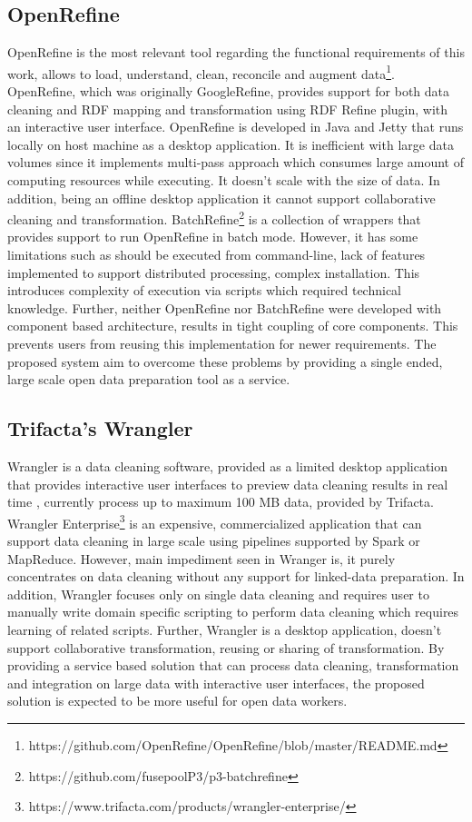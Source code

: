 \subsection{OpenRefine}
OpenRefine is the most relevant tool regarding the functional requirements of this work, allows to load, understand, clean, reconcile and augment data\footnote{https://github.com/OpenRefine/OpenRefine/blob/master/README.md}. OpenRefine, which was originally GoogleRefine, provides support for both data cleaning and RDF mapping and transformation using RDF Refine plugin, with an interactive user interface. OpenRefine is developed in Java and Jetty that runs locally on host machine as a desktop application. It is inefficient with large data volumes since it implements multi-pass approach \cite{onestopshotforopendata} which consumes large amount of computing resources while executing. It doesn't scale with the size of data. In addition, being an offline desktop application it cannot support collaborative cleaning and transformation.  BatchRefine\footnote{https://github.com/fusepoolP3/p3-batchrefine} is a collection of wrappers that provides support to run OpenRefine in batch mode. However, it has some limitations such as should be executed from command-line, lack of features implemented to support distributed processing, complex installation. This introduces complexity of execution via scripts which required technical knowledge. Further, neither OpenRefine nor BatchRefine were developed with component based architecture, results in tight coupling of core components. This prevents users from reusing this implementation for newer requirements. The proposed system aim to overcome these problems by providing a single ended, large scale open data preparation tool as a service.  
\subsection{Trifacta's Wrangler}
Wrangler is a data cleaning software, provided as a limited desktop application that provides interactive user interfaces to preview data cleaning results in real time \cite{2011-wrangler} \cite{visualizationsandtransformationsinwrangling} \cite{Keim08visualanalytics:}, currently process up to maximum 100 MB data, provided by Trifacta. Wrangler Enterprise\footnote{https://www.trifacta.com/products/wrangler-enterprise/} is an expensive, commercialized application that can support data cleaning in large scale using pipelines supported by Spark or MapReduce. However, main impediment seen in Wranger is, it purely concentrates on data cleaning without any support for linked-data preparation. In addition, Wrangler focuses only on single data cleaning and requires user to manually write domain specific scripting to perform data cleaning which requires learning of related scripts. Further, Wrangler is a desktop application, doesn't support collaborative transformation, reusing or sharing of transformation. By providing a service based solution that can process data cleaning, transformation and integration on large data with interactive user interfaces, the proposed solution is expected to be more useful for open data workers. 
